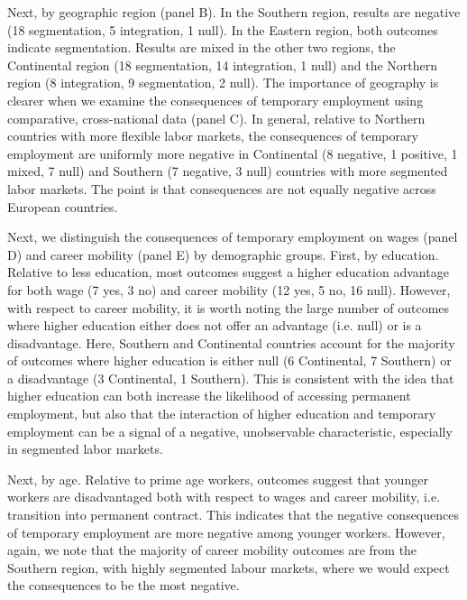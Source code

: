 \documentclass[12pt]{article}
\begin{document}
Next, by geographic region (panel B).  In the Southern region, results are negative (18 segmentation, 5 integration, 1 null).  In the Eastern region, both outcomes indicate segmentation.  Results are mixed in the other two regions, the Continental region (18 segmentation, 14 integration, 1 null) and the Northern region (8 integration, 9 segmentation, 2 null).  The importance of geography is clearer when we examine the consequences of temporary employment using comparative, cross-national data (panel C).  In general, relative to Northern countries with more flexible labor markets, the consequences of temporary employment are uniformly more negative in Continental (8 negative, 1 positive, 1 mixed, 7 null) and Southern (7 negative, 3 null) countries with more segmented labor markets.  The point is that consequences are not equally negative across European countries.

Next, we distinguish the consequences of temporary employment on wages (panel D) and career mobility (panel E) by demographic groups.  First, by education.  Relative to less education, most outcomes suggest a higher education advantage for both wage (7 yes, 3 no) and career mobility (12 yes, 5 no, 16 null).  However, with respect to career mobility, it is worth noting the large number of outcomes where higher education either does not offer an advantage (i.e. null) or is a disadvantage.  Here, Southern and Continental countries account for the majority of outcomes where higher education is either null (6 Continental, 7 Southern) or a disadvantage (3 Continental, 1 Southern).  This is consistent with the idea that higher education can both increase the likelihood of accessing permanent employment, but also that the interaction of higher education and temporary employment can be a signal of a negative, unobservable characteristic, especially in segmented labor markets.

Next, by age.  Relative to prime age workers, outcomes suggest that younger workers are disadvantaged both with respect to wages and career mobility, i.e. transition into permanent contract.  This indicates that the negative consequences of temporary employment are more negative among younger workers.  However, again, we note that the majority of career mobility outcomes are from the Southern region, with highly segmented labour markets, where we would expect the consequences to be the most negative.  
\end{document}
